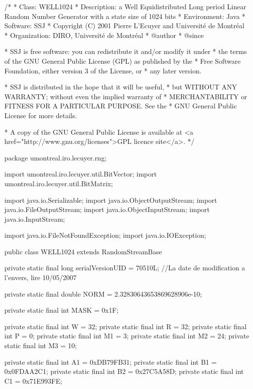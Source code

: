 \begin{code}
\begin{hide}
/*
 * Class:        WELL1024
 * Description:  a Well Equidistributed Long period Linear Random Number
                 Generator with a state size of 1024 bits
 * Environment:  Java
 * Software:     SSJ 
 * Copyright (C) 2001  Pierre L'Ecuyer and Université de Montréal
 * Organization: DIRO, Université de Montréal
 * @author       
 * @since

 * SSJ is free software: you can redistribute it and/or modify it under
 * the terms of the GNU General Public License (GPL) as published by the
 * Free Software Foundation, either version 3 of the License, or
 * any later version.

 * SSJ is distributed in the hope that it will be useful,
 * but WITHOUT ANY WARRANTY; without even the implied warranty of
 * MERCHANTABILITY or FITNESS FOR A PARTICULAR PURPOSE.  See the
 * GNU General Public License for more details.

 * A copy of the GNU General Public License is available at
   <a href="http://www.gnu.org/licenses">GPL licence site</a>.
 */
\end{hide}
package umontreal.iro.lecuyer.rng; \begin{hide}

import umontreal.iro.lecuyer.util.BitVector;
import umontreal.iro.lecuyer.util.BitMatrix;

import java.io.Serializable;
import java.io.ObjectOutputStream;
import java.io.FileOutputStream;
import java.io.ObjectInputStream;
import java.io.InputStream;

import java.io.FileNotFoundException;
import java.io.IOException;
\end{hide}

public class WELL1024 extends RandomStreamBase \begin{hide} {

   private static final long serialVersionUID = 70510L;
   //La date de modification a l'envers, lire 10/05/2007

   private static final double NORM = 2.32830643653869628906e-10;

   private static final int MASK = 0x1F;

   private static final int W = 32;
   private static final int R = 32;
   private static final int P = 0;
   private static final int M1 = 3;
   private static final int M2 = 24;
   private static final int M3 = 10;

   private static final int A1 = 0xDB79FB31;
   private static final int B1 = 0x0FDAA2C1;
   private static final int B2 = 0x27C5A58D;
   private static final int C1 = 0x71E993FE;


}
\end{hide}
\end{code}
